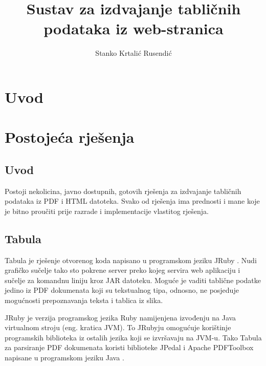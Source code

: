 \documentclass[times, utf8, zavrsni]{fer}
\begin{document}

\title{Sustav za izdvajanje tabličnih podataka iz web-stranica}

\author{Stanko Krtalić Rusendić}

\maketitle

\zahvala{}

\tableofcontents

\chapter{Uvod}



\chapter{Postojeća rješenja}

\section{Uvod}

Postoji nekolicina, javno dostupnih, gotovih rješenja za izdvajanje tabličnih
podataka iz PDF \cite{pdf_documentation}
i HTML \cite{html_documentation}
datoteka. Svako od rješenja ima prednosti i mane koje je
bitno proučiti prije razrade i implementacije vlastitog rješenja.

\section{Tabula}

Tabula \cite{tabula_repository} je rješenje otvorenog koda napisano u
programskom jeziku JRuby \cite{jruby_documentation}.
Nudi grafičko sučelje tako sto pokrene server preko kojeg servira web
aplikaciju i sučelje za komandnu liniju kroz
JAR \cite{java_language_specification} datoteku. Moguće je vaditi
tablične podatke jedino iz PDF dokumenata koji su tekstualnog tipa, odnosno,
ne posjeduje mogućnosti prepoznavanja teksta i tablica iz slika.

JRuby je verzija programskog jezika Ruby namijenjena izvođenju na Java
virtualnom stroju \cite{java_virtual_machine_specification} (eng. kratica JVM).
To JRubyju omogućuje korištinje
programskih biblioteka iz ostalih jezika koji se izvršavaju na JVM-u. Tako
Tabula za parsiranje PDF dokumenata koristi biblioteke JPedal i Apache
PDFToolbox \cite{apache_pdftoolbox_specification} napisane u programskom
jeziku Java \cite{java_language_specification}.
\end{document}
